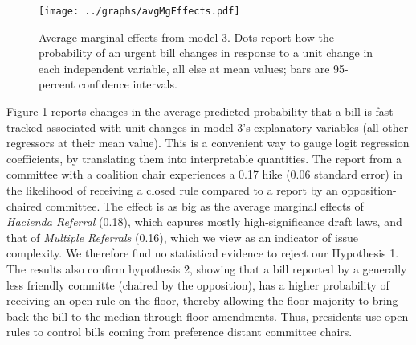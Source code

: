\documentclass[letter,12pt]{article}
\begin{document}

\begin{figure}
  \centering
    \caption{Average marginal effects from model 3. Dots report how the probability of an urgent bill changes in response to a unit change in each independent variable, all else at mean values; bars are 95-percent confidence intervals.}\label{F:avgMg}
    \texttt{[image: ../graphs/avgMgEffects.pdf]}
\end{figure}

Figure \ref{F:avgMg} reports changes in the average predicted probability that a bill is fast-tracked associated with unit changes in model 3's explanatory variables (all other regressors at their mean value). This is a convenient way to gauge logit regression coefficients, by translating them into interpretable quantities. The report from a committee with a coalition chair experiences a 0.17 hike (0.06 standard error) in the likelihood of receiving a closed rule compared to a report by an opposition-chaired committee. The effect is as big as the average marginal effects of \emph{Hacienda Referral} (0.18), which capures mostly high-significance draft laws, and that of \emph{Multiple Referrals} (0.16), which we view as an indicator of issue complexity. We therefore find no statistical evidence to reject our Hypothesis 1. The results also confirm hypothesis 2, showing that a bill reported by a generally less friendly committe (chaired by the opposition), has a higher probability of receiving an open rule on the floor, thereby allowing the floor majority to bring back the bill to the median through floor amendments. Thus, presidents use open rules to control bills coming from preference distant committee chairs.
\end{document}
